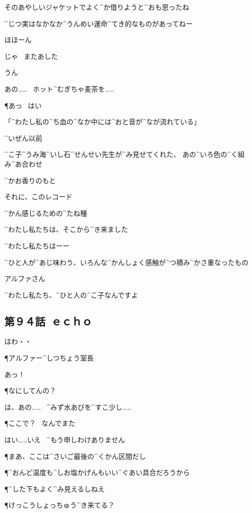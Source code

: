 \SH そのあやしいジャケットでよく^{か}{借}りようと^{おも}{思}ったね

\K ^{じつ}{実}はなかなか^{うんめい}{運命}^{てき}{的}なものがあってねー

\SH ほほーん

\page
\SH じゃ
\ またあした

\K うん

\page
\K あの……
\ ホット^{むぎちゃ}{麦茶}を……

\P あっ
\ はい

\page[82]
\K 「^{わたし}{私}の^{ち}{血}の^{なか}{中}には^{おと}{音}が^{なが}{流}れている」

\page
\K ^{いぜん}{以前}

\K ^{こ}{子}^{うみ}{海}^{いし}{石}^{せんせい}{先生}が^{み}{見}せてくれた、
あの^{いろ}{色}の^{く}{組}み^{あ}{合}わせ

\K ^{かお}{香}りのもと

\K それに、このレコード

\K ^{かん}{感}じるための^{たね}{種}

\page
\K ^{わたし}{私}たちは、そこから^{き}{来}ました

\K ^{わたし}{私}たちはーー

\K ^{ひと}{人}が^{あじ}{味}わう、いろんな^{かんしょく}{感触}が^{つ}{積}み^{かさ}{重}なったもの

\page
\K アルファさん

\page
\K ^{わたし}{私}たち、^{ひと}{人}の^{こ}{子}なんですよ


\subsection{第９４話\ ｅｃｈｏ}

\page[89]
\A ほわ・・

\page[95]
\P アルファー^{しつちょう}{室長}

\AM あっ！

\P なにしてんの？

\AM は、あの……
\ ^{みず}{水}あびを^{すこ}{少}し……

\P ここで？
\ なんでまた

\AM はい……いえ
\ ^{もう}{申}しわけありません

\page
\P まあ、ここは^{さいご}{最後}の^{くかん}{区間}だし

\P ^{おんど}{温度}も^{しお}{塩}かげんもいい^{ぐあい}{具合}だろうから

\P ^{した}{下}もよく^{み}{見}えるしねえ

\P けっこうしょっちゅう^{き}{来}てる？

